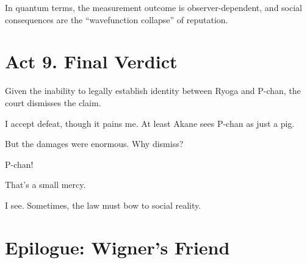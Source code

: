 \documentclass[12pt]{article}
\begin{document}
\begin{tcolorbox}[title=Ranma:]
In quantum terms, the measurement outcome is observer-dependent, and social consequences are the “wavefunction collapse” of reputation.
\end{tcolorbox}

\section*{Act 9. Final Verdict}

\begin{tcolorbox}[title=Judge:]
Given the inability to legally establish identity between Ryoga and P-chan, the court dismisses the claim.
\end{tcolorbox}

\begin{tcolorbox}[title=Ryoga:]
I accept defeat, though it pains me. At least Akane sees P-chan as just a pig.
\end{tcolorbox}

\begin{tcolorbox}[title={Judge (confused):}]
But the damages were enormous. Why dismiss?
\end{tcolorbox}

\begin{tcolorbox}[title={Akane (calling out affectionately):}]
P-chan!
\end{tcolorbox}

\begin{tcolorbox}[title={Ryoga (smiling faintly):}]
That’s a small mercy.
\end{tcolorbox}

\begin{tcolorbox}[title={Judge (finally understanding):}]
I see. Sometimes, the law must bow to social reality.
\end{tcolorbox}

\section*{Epilogue: Wigner's Friend}
\end{document}
